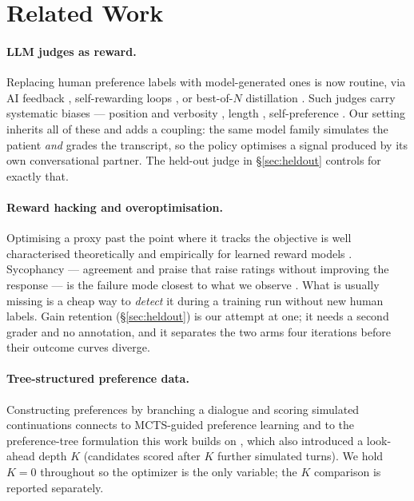 \section{Related Work}
\label{sec:related}

\paragraph{LLM judges as reward.} Replacing human preference labels with model-generated ones
\citep{christiano2017deeprl,ouyang2022instructgpt} is now routine, via AI feedback
\citep{guo2024oaif}, self-rewarding loops \citep{yuan2024selfrewarding}, or best-of-$N$
distillation \citep{pace2024westofn}. Such judges carry systematic biases --- position and
verbosity \citep{zheng2023judging}, length \citep{dubois2024lengthcontrolled}, self-preference
\citep{panickssery2024selfpreference}. Our setting inherits all of these and adds a coupling:
the same model family simulates the patient \emph{and} grades the transcript, so the policy
optimises a signal produced by its own conversational partner. The held-out judge in
\S\ref{sec:heldout} controls for exactly that.

\paragraph{Reward hacking and overoptimisation.} Optimising a proxy past the point where it
tracks the objective is well characterised theoretically \citep{skalse2022defining} and
empirically for learned reward models \citep{gao2023scaling}. Sycophancy --- agreement and
praise that raise ratings without improving the response --- is the failure mode closest to
what we observe \citep{sharma2024sycophancy,perez2023discovering}. What is usually missing is
a cheap way to \emph{detect} it during a training run without new human labels. Gain
retention (\S\ref{sec:heldout}) is our attempt at one; it needs a second grader and no
annotation, and it separates the two arms four iterations before their outcome curves
diverge.

\paragraph{Tree-structured preference data.} Constructing preferences by branching a dialogue
and scoring simulated continuations connects to MCTS-guided preference learning
\citep{xie2024mctsdpo,yu2023promptmcts,yuan2024eurus} and to the preference-tree formulation
this work builds on \citep{baruch2025pto}, which also introduced a look-ahead depth $K$
(candidates scored after $K$ further simulated turns). We hold $K=0$ throughout so the
optimizer is the only variable; the $K$ comparison is reported separately.

